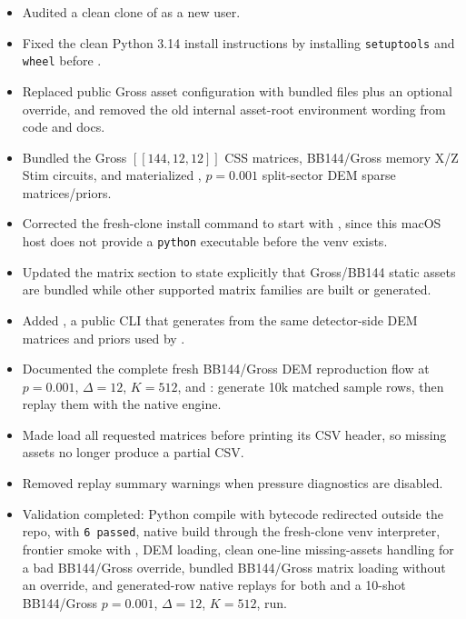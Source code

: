 \begin{itemize}
\item Audited a clean clone of \texttt{} as a new user.
\item Fixed the clean Python 3.14 install instructions by installing \texttt{setuptools} and \texttt{wheel} before \texttt{}.
\item Replaced public Gross asset configuration with bundled \texttt{} files plus an optional \texttt{} override, and removed the old internal asset-root environment wording from code and docs.
\item Bundled the Gross \(\left[\left[144,12,12\right]\right]\) CSS matrices, BB144/Gross memory X/Z Stim circuits, and materialized \texttt{}, \(p=0.001\) split-sector DEM sparse matrices/priors.
\item Corrected the fresh-clone install command to start with \texttt{}, since this macOS host does not provide a \texttt{python} executable before the venv exists.
\item Updated the matrix section to state explicitly that Gross/BB144 static assets are bundled while other supported matrix families are built or generated.
\item Added \texttt{}, a public CLI that generates \texttt{} from the same detector-side DEM matrices and priors used by \texttt{}.
\item Documented the complete fresh BB144/Gross DEM reproduction flow at \(p=0.001\), \(\Delta=12\), \(K=512\), and \texttt{}: generate 10k matched sample rows, then replay them with the native engine.
\item Made \texttt{} load all requested matrices before printing its CSV header, so missing assets no longer produce a partial CSV.
\item Removed replay summary warnings when pressure diagnostics are disabled.
\item Validation completed: Python compile with bytecode redirected outside the repo, \texttt{} with \texttt{6 passed}, native build through the fresh-clone venv interpreter, frontier smoke with \texttt{}, \texttt{} DEM loading, clean one-line missing-assets handling for a bad BB144/Gross \texttt{} override, bundled BB144/Gross matrix loading without an override, and generated-row native replays for both \texttt{} and a 10-shot BB144/Gross \(p=0.001\), \(\Delta=12\), \(K=512\), \texttt{} run.
\end{itemize}

